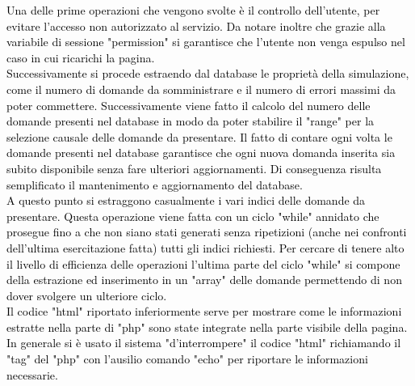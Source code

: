 \textcolor{black}{Una delle prime operazioni che vengono svolte è il controllo dell'utente, per evitare l'accesso non autorizzato al servizio. Da notare inoltre che grazie alla variabile di sessione "permission" si garantisce che l'utente non venga espulso nel caso in cui ricarichi la pagina.\\
Successivamente si procede estraendo dal database le proprietà della simulazione, come il numero di domande da somministrare e il numero di errori massimi da poter commettere. Successivamente viene fatto il calcolo del numero delle domande presenti nel database in modo da poter stabilire il "range" per la selezione causale delle domande da presentare. Il fatto di contare ogni volta le domande presenti nel database garantisce che ogni nuova domanda inserita sia subito disponibile senza fare ulteriori aggiornamenti. Di conseguenza risulta semplificato il mantenimento e aggiornamento del database.\\
A questo punto si estraggono casualmente i vari indici delle domande da presentare. Questa operazione viene fatta con un ciclo "while" annidato che prosegue fino a che non siano stati generati senza ripetizioni (anche nei confronti dell'ultima esercitazione fatta) tutti gli indici richiesti. Per cercare di tenere alto il livello di efficienza delle operazioni l'ultima parte del ciclo "while" si compone della estrazione ed inserimento in un "array" delle domande permettendo di non dover svolgere un ulteriore ciclo.}\\
\bigskip
\textcolor{black}{Il codice "html" riportato inferiormente serve per mostrare come le informazioni estratte nella parte di "php" sono state integrate nella parte visibile della pagina. In generale si è usato il sistema "d'interrompere" il codice "html" richiamando il "tag" del "php" con l'ausilio comando "echo" per riportare le informazioni necessarie.}\\

